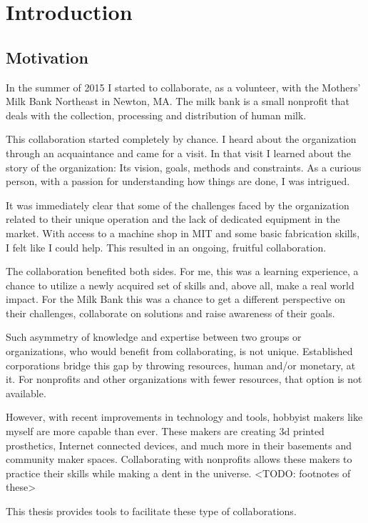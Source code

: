 \chapter{Introduction}
\label{chap_intro}

\section{Motivation}
In the summer of 2015 I started to collaborate, as a volunteer, with the Mothers’ Milk Bank Northeast in Newton, MA. The milk bank is a small nonprofit that deals with the collection, processing and distribution of human milk.

This collaboration started completely by chance. I heard about the organization through an acquaintance and came for a visit. In that visit I learned about the story of the organization: Its vision, goals, methods and constraints. As a curious person, with a passion for understanding how things are done, I was intrigued. 

It was immediately clear that some of the challenges faced by the organization related to their unique operation and the lack of dedicated equipment in the market. With access to a machine shop in MIT and some basic fabrication skills, I felt like I could help. This resulted in an ongoing, fruitful collaboration. 

The collaboration benefited both sides. For me, this was a learning experience, a chance to utilize a newly acquired set of skills and, above all, make a real world impact. For the Milk Bank this was a chance to get a different perspective on their challenges, collaborate on solutions and raise awareness of their goals.   

Such asymmetry of knowledge and expertise between two groups or organizations, who would benefit from collaborating, is not unique. Established corporations bridge this gap by throwing resources, human and/or monetary, at it. For nonprofits and other organizations with fewer resources, that option is not available.

However, with recent improvements in technology and tools, hobbyist makers like myself are more capable than ever. These makers are creating 3d printed prosthetics, Internet connected devices, and much more in their basements and community maker spaces. Collaborating with nonprofits allows these makers to practice their skills while making a dent in the universe. <TODO: footnotes of these>

This thesis provides tools to facilitate these type of collaborations.



